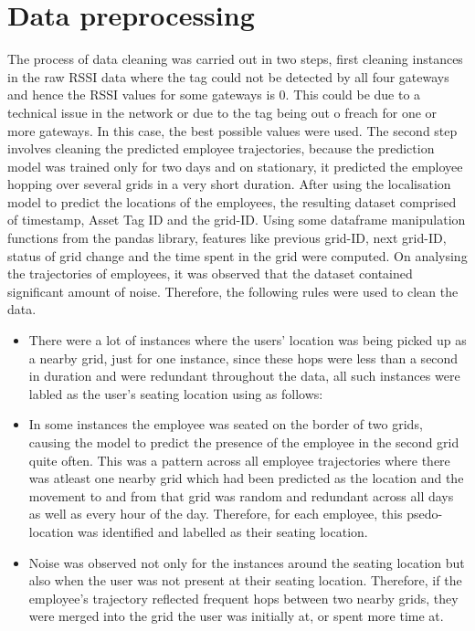 \documentclass[acmtog]{acmart}
\begin{document}


\section{Data preprocessing}
The process of data cleaning was carried out in two steps, first cleaning instances in the raw RSSI data where the tag could not be detected by all four gateways and hence the RSSI values for some gateways is 0. This could be due to a technical issue in the network or due to the tag being out o freach for one or more gateways. In this case, the best possible values were used. The second step involves cleaning the predicted employee trajectories, because the prediction model was trained only for two days and on stationary, it predicted the employee hopping over several grids in a very short duration.  
After using the localisation model to predict the locations of the employees, the resulting dataset comprised of timestamp, Asset Tag ID and the grid-ID. Using some dataframe manipulation functions from the pandas library, features like previous grid-ID, next grid-ID, status of grid change and the time spent in the grid were computed. On analysing the trajectories of employees, it was observed that the dataset contained significant amount of noise. Therefore, the following rules were used to clean the data.
  
\begin{itemize}
    \item There were a lot of instances where the users' location was being picked up as a nearby grid, just for one instance, since these hops were less than a second in duration and were redundant throughout the data, all such instances were labled as the user's seating location using as follows:
    \item In some instances the employee was seated on the border of two grids, causing the model to predict the presence of the employee in the second grid quite often. This was a pattern across all employee trajectories where there was atleast one nearby grid which had been predicted as the location and the movement to and from that grid was random and redundant across all days as well as every hour of the day. Therefore, for each employee, this psedo-location was identified and labelled as their seating location.
    \item Noise was observed not only for the instances around the seating location but also when the user was not present at their seating location. Therefore, if the employee's trajectory reflected frequent hops between two nearby grids, they were merged into the grid the user was initially at, or spent more time at.
    
\end{itemize}
\end{document}

